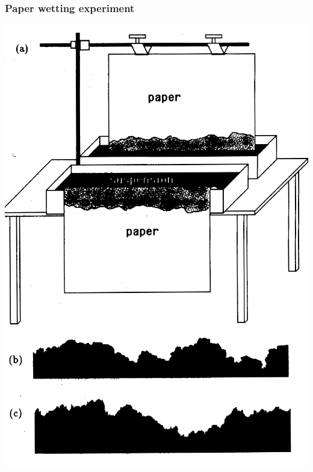 \documentclass[9pt,table,xcolor=dvipsnames]{beamer}
\begin{document}
\begin{frame}[fragile] %
  \frametitle{Paper wetting experiment}

  \begin{center}
    \includegraphics[scale=0.14]{./figs/Figure_1-2_Paper-ink.png} \pause
    \includegraphics[scale=0.20]{./figs/Figure_1-2_PaperInk-b-c.png}
  \end{center}

\end{frame}
\end{document}
